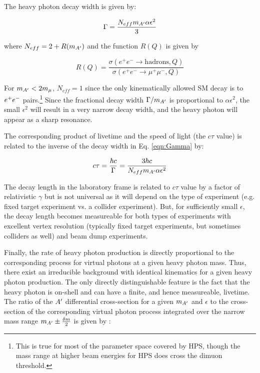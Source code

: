 The heavy photon decay width is given by:

\begin{equation}
    \Gamma=\frac{N_{eff}m_{A^\prime}\alpha \epsilon^2}{3}
    \label{eqn:Gamma}
\end{equation}

where $N_{eff}=2+R(m_{A^\prime})$ and the function $R(Q)$ is given by

\begin{equation}
    R(Q)=\frac{\sigma(e^+e^- \rightarrow \mathrm{hadrons},Q)}{\sigma(e^+e^- \rightarrow \mu^+ \mu^-,Q)}
    \label{eqn:r}
\end{equation}

For $m_{A^\prime}<2m_{\mu}$, $N_{eff}=1$ since the only kinematically allowed SM decay is to $e^{+}e^{-}$ pairs.\footnote{This is true for most of the parameter space covered by HPS, though the mass range at higher beam energies for HPS does cross the dimuon threshold.} Since the fractional decay width $\Gamma/m_{A^\prime}$ is proportional to $\alpha \epsilon^2$, the small $\epsilon^2$ will result in a very narrow decay width, and the heavy photon will appear as a sharp resonance.

The corresponding product of livetime and the speed of light (the $c\tau$ value) is related to the inverse of the decay width in Eq. \ref{eqn:Gamma} by:


\begin{equation}
    c\tau=\frac{\hbar c}{\Gamma}=\frac{3\hbar c}{N_{eff}m_{A^\prime}\alpha \epsilon^2}
    \label{eqn:ctau}
\end{equation}

The decay length in the laboratory frame is related to $c\tau$ value by a factor of relativistic $\gamma$ but is not universal as it will depend on the type of experiment (e.g. fixed target experiment vs. a collider experiment). But, for sufficiently small $\epsilon$, the decay length becomes measureable for both types of experiments with excellent vertex resolution (typically fixed target experiments, but sometimes colliders as well) and beam dump experiments.

Finally, the rate of heavy photon production is directly proportional to the corresponding process for virtual photons at a given heavy photon mass. Thus, there exist an irreducible background with identical kinematics for a given heavy photon production. The only directly distinguishable feature is the fact that the heavy photon is on-shell and can have a finite, and hence measureable, livetime. The ratio of the $A^\prime$ differential cross-section for a given $m_{A^\prime}$ and $\epsilon$ to the cross-section of the corresponding virtual photon process integrated over the narrow mass range $m_{A^\prime} \pm \frac{\delta m}{2}$ is given by \cite{Bjorken:2009mm}:

